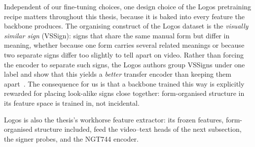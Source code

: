 Independent of our fine-tuning choices, one design choice of the Logos
pretraining recipe matters throughout this thesis, because it is baked
into every feature the backbone produces. The organising construct of
the Logos dataset is the
\emph{visually similar sign} (VSSign): signs that share the same manual
form but differ in meaning, whether because one form carries several
related meanings or because two separate signs differ too slightly to
tell apart on video.
Rather than forcing the encoder to separate such signs, the Logos authors
group VSSigns under one label and show that this yields a \emph{better}
transfer encoder than keeping them apart~\cite{ovodovLogosWellTemperedPretrain2025}.
The consequence for us is that a backbone trained this way is explicitly
rewarded for placing look-alike signs close together: form-organised
structure in its feature space is trained in, not incidental.

Logos is also the thesis's workhorse feature extractor: its frozen
features, form-organised structure included, feed the video--text
heads of the next subsection, the signer probes, and the NGT744 encoder.

